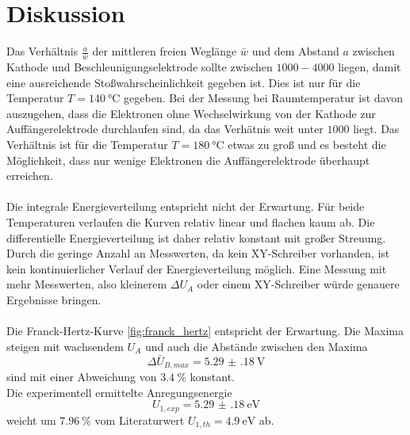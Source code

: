 \section{Diskussion}
\label{sec:Diskussion}
Das Verhältnis $\frac{a}{\bar{w}}$ der mittleren freien Weglänge $\bar{w}$ und dem Abstand $a$ zwischen Kathode und Beschleunigungselektrode sollte zwischen $1000 - 4000$ liegen, damit eine ausreichende Stoßwahrscheinlichkeit gegeben ist.
Dies ist nur für die Temperatur $T = \SI{140}{\degreeCelsius}$ gegeben.
Bei der Messung bei Raumtemperatur ist davon auszugehen, dass die Elektronen ohne Wechselwirkung von der Kathode zur Auffängerelektrode durchlaufen sind, da das Verhätnis weit unter $1000$ liegt.
Das Verhältnis ist für die Temperatur $T = \SI{180}{\degreeCelsius}$ etwas zu groß und es besteht die Möglichkeit, dass nur wenige Elektronen die Auffängerelektrode überhaupt erreichen.
\\
\\
Die integrale Energieverteilung entspricht nicht der Erwartung.
Für beide Temperaturen verlaufen die Kurven relativ linear und flachen kaum ab.
Die differentielle Energieverteilung ist daher relativ konstant mit großer Streuung.
\\
Durch die geringe Anzahl an Messwerten, da kein XY-Schreiber vorhanden, ist kein kontinuierlicher Verlauf der Energieverteilung möglich.
Eine Messung mit mehr Messwerten, also kleinerem $\Delta U_A$ oder einem XY-Schreiber würde genauere Ergebnisse bringen.
\\
\\
Die Franck-Hertz-Kurve \ref{fig:franck_hertz} entspricht der Erwartung.
Die Maxima steigen mit wachsendem $U_A$ und auch die Abstände zwischen den Maxima
\begin{equation*}
    \Delta \bar{U}_{B,max} = \SI{5.29(18)}{\volt}
\end{equation*}
sind mit einer Abweichung von $\SI{3.4}{\percent}$ konstant.
\\
Die experimentell ermittelte Anregungsenergie
\begin{equation*}
    U_{1,exp} = \SI{5.29(18)}{\electronvolt}
\end{equation*}
weicht um $\SI{7.96}{\percent}$ vom Literaturwert \cite{anregungsenergie} ${U_{1,th} = \SI{4.9}{\electronvolt}}$ ab.